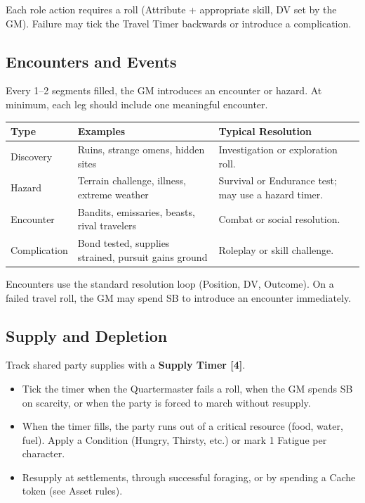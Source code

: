 Each role action requires a roll (Attribute + appropriate skill, DV set by the GM). Failure may tick the Travel Timer backwards or introduce a complication.

\subsection{Encounters and Events}

Every 1--2 segments filled, the GM introduces an encounter or hazard. At minimum, each leg should include one meaningful encounter.

\begin{tabular}{@{}lp{4cm}p{6cm}@{}}
\toprule
\textbf{Type} & \textbf{Examples} & \textbf{Typical Resolution} \\
\midrule
Discovery & Ruins, strange omens, hidden sites & Investigation or exploration roll. \\
Hazard & Terrain challenge, illness, extreme weather & Survival or Endurance test; may use a hazard timer. \\
Encounter & Bandits, emissaries, beasts, rival travelers & Combat or social resolution. \\
Complication & Bond tested, supplies strained, pursuit gains ground & Roleplay or skill challenge. \\
\bottomrule
\end{tabular}

Encounters use the standard resolution loop (Position, DV, Outcome). On a failed travel roll, the GM may spend SB to introduce an encounter immediately.

\subsection{Supply and Depletion}

Track shared party supplies with a \textbf{Supply Timer [4]}.

\begin{itemize}
  \item Tick the timer when the Quartermaster fails a roll, when the GM spends SB on scarcity, or when the party is forced to march without resupply.
  \item When the timer fills, the party runs out of a critical resource (food, water, fuel). Apply a Condition (Hungry, Thirsty, etc.) or mark 1 Fatigue per character.
  \item Resupply at settlements, through successful foraging, or by spending a Cache token (see Asset rules).
\end{itemize}


